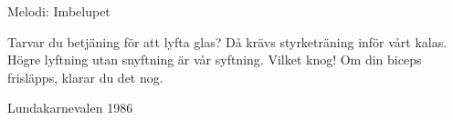 \begin{song}

\begin{songmeta}
Melodi: Imbelupet
\end{songmeta}

\begin{songtext}
Tarvar du betjäning för att lyfta glas?
Då krävs styrketräning inför vårt kalas.
Högre lyftning utan snyftning
är vår syftning. Vilket knog!
Om din biceps frisläpps,
klarar du det nog.
\end{songtext}

\begin{songnotes}
Lundakarnevalen 1986
\end{songnotes}

\end{song}
